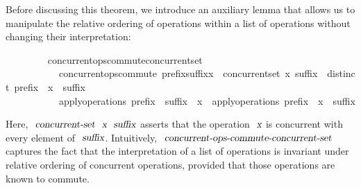 Before discussing this theorem, we introduce an auxiliary lemma that allows us to manipulate the relative ordering of operations within a list of operations without changing their interpretation:
\vspace{0.375em}
\begin{isabellebody}
\ \ \ \ \ \ \ \  concurrent{\isacharunderscore}ops{\isacharunderscore}commute{\isacharunderscore}concurrent{\isacharunderscore}set{\isacharcolon}\isanewline
\ \ \ \ \ \ \ \ \ \ \ {\isachardoublequoteopen}concurrent{\isacharunderscore}ops{\isacharunderscore}commute\ {\isacharparenleft}prefix{\isacharat}suffix{\isacharat}{\isacharbrackleft}x{\isacharbrackright}{\isacharparenright}{\isachardoublequoteclose}\ \ {\isachardoublequoteopen}concurrent{\isacharunderscore}set\ x\ suffix{\isachardoublequoteclose}\ \ {\isachardoublequoteopen}distinct\ {\isacharparenleft}prefix\ {\isacharat}\ x\ {\isacharhash}\ suffix{\isacharparenright}{\isachardoublequoteclose}\isanewline
\ \ \ \ \ \ \ \ \ \ \ {\isachardoublequoteopen}apply{\isacharunderscore}operations\ {\isacharparenleft}prefix\ {\isacharat}\ suffix\ {\isacharat}\ {\isacharbrackleft}x{\isacharbrackright}{\isacharparenright}\ {\isacharequal}\ apply{\isacharunderscore}operations\ {\isacharparenleft}prefix\ {\isacharat}\ x\ {\isacharhash}\ suffix{\isacharparenright}{\isachardoublequoteclose}
\end{isabellebody}
\vspace{0.375em}
Here, $\isa{concurrent-set}\ \isa{x}\ \isa{suffix}$ asserts that the operation $\isa{x}$ is concurrent with every element of $\isa{suffix}$.
Intuitively, $\isa{concurrent-ops-commute-concurrent-set}$ captures the fact that the interpretation of a list of operations is invariant under relative ordering of concurrent operations, provided that those operations are known to commute.

